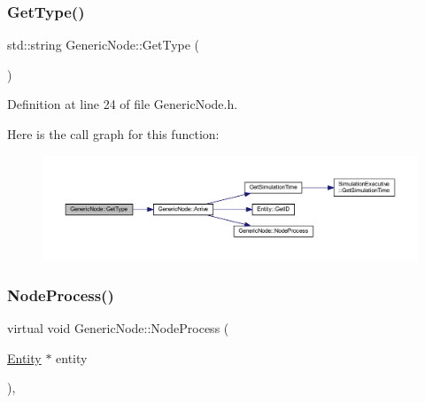 \mbox{\label{class_generic_node_a8bee56c218e7d322401a37374acab36a}} 
\subsubsection{\texorpdfstring{Get\+Type()}{GetType()}}
{\footnotesize\ttfamily std\+::string Generic\+Node\+::\+Get\+Type (\begin{DoxyParamCaption}{ }\end{DoxyParamCaption})\hspace{0.3cm}{\ttfamily [inline]}}



Definition at line 24 of file Generic\+Node.\+h.

Here is the call graph for this function\+:
\nopagebreak
\begin{figure}[H]
\begin{center}
\leavevmode
\includegraphics[width=350pt]{class_generic_node_a8bee56c218e7d322401a37374acab36a_cgraph}
\end{center}
\end{figure}
\mbox{\label{class_generic_node_ae942258a57f211072d179da470579add}} 
\subsubsection{\texorpdfstring{Node\+Process()}{NodeProcess()}}
{\footnotesize\ttfamily virtual void Generic\+Node\+::\+Node\+Process (\begin{DoxyParamCaption}\item[{\hyperlink{class_entity}{Entity} $\ast$}]{entity }\end{DoxyParamCaption})\hspace{0.3cm}{\ttfamily [protected]}, {}}



